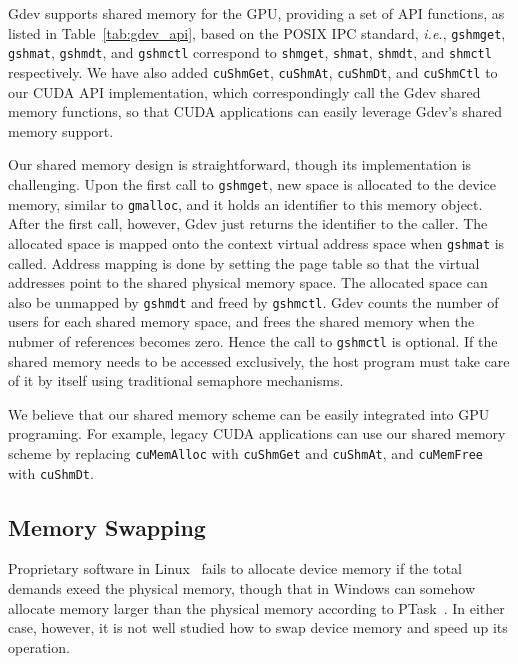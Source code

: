Gdev supports shared memory for the GPU, providing a set of API
functions, as listed in Table~\ref{tab:gdev_api}, based on the POSIX IPC
standard, \textit{i.e.}, \texttt{gshmget}, \texttt{gshmat},
\texttt{gshmdt}, and \texttt{gshmctl} correspond to \texttt{shmget},
\texttt{shmat}, \texttt{shmdt}, and \texttt{shmctl} respectively.
We have also added \texttt{cuShmGet}, \texttt{cuShmAt},
\texttt{cuShmDt}, and \texttt{cuShmCtl} to our CUDA API 
implementation, which correspondingly call the Gdev shared memory
functions, so that CUDA applications can easily leverage Gdev's shared
memory support.

Our shared memory design is straightforward, though its implementation
is challenging.
Upon the first call to \texttt{gshmget}, new space is allocated to the
device memory, similar to \texttt{gmalloc}, and it holds an identifier
to this memory object. 
After the first call, however, Gdev just returns the identifier to the
caller.
The allocated space is mapped onto the context virtual address space
when \texttt{gshmat} is called.
Address mapping is done by setting the page table so that the virtual
addresses point to the shared physical memory space.
The allocated space can also be unmapped by \texttt{gshmdt} and freed by
\texttt{gshmctl}. 
Gdev counts the number of users for each shared memory space,
and frees the shared memory when the nubmer of references becomes zero.
Hence the call to \texttt{gshmctl} is optional.
If the shared memory needs to be accessed exclusively, the host program
must take care of it by itself using traditional semaphore mechanisms.

We believe that our shared memory scheme can be easily integrated into
GPU programing.
For example, legacy CUDA applications can use our shared memory scheme
by replacing \texttt{cuMemAlloc} with \texttt{cuShmGet} and
\texttt{cuShmAt}, and \texttt{cuMemFree} with \texttt{cuShmDt}.

\subsection{Memory Swapping}
\label{sec:memory_swapping}

Proprietary software in Linux~\cite{BLOB,CUDA40} fails to allocate
device memory if the total demands exeed the physical memory, though
that in Windows can somehow allocate memory larger than the physical
memory according to PTask~\cite{Rossbach_SOSP11}. 
In either case, however, it is not well studied how to swap device
memory and speed up its operation.

